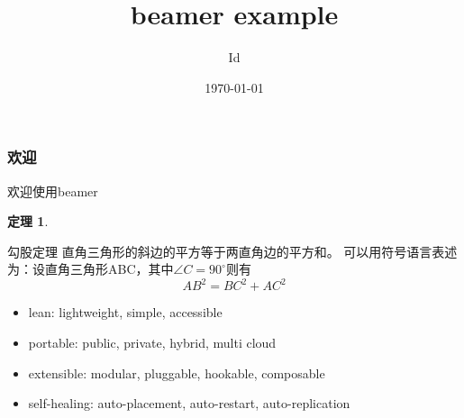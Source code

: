\documentclass{beamer}
\title{beamer example} %
\author{Id} %
\institute[mygroup] %
{
	mygroup \\ %
	\medskip
	\textit{id@mygroup.com} %
}
\date{\today} %
\begin{document}
\newcommand{\sech}{\mbox{sech}}
\newtheorem{thm}{定理}[section]

\frame{\titlepage}
\frame{\tableofcontents}

\begin{frame} \frametitle{欢迎}
	欢迎使用beamer
	\begin{thm}
	\end{thm}

	\begin{block}{勾股定理}  
		直角三角形的斜边的平方等于两直角边的平方和。  
		可以用符号语言表述为：设直角三角形ABC，其中$\angle C=90^\circ$则有  
		\begin{equation}  
			AB^2=BC^2+AC^2  
		\end{equation}  
	\end{block}  

	\begin{itemize}
		\item lean: lightweight, simple, accessible\\
			\pause
		\item portable: public, private, hybrid, multi cloud\\
			\pause
		\item extensible: modular, pluggable, hookable, composable\\
			\pause
		\item self-healing: auto-placement, auto-restart, auto-replication\\
	\end{itemize}
\end{frame}
\end{document}
